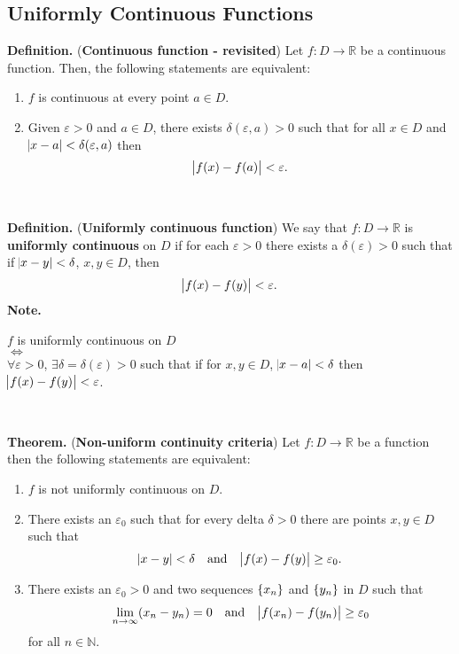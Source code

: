 \documentclass[12pt,a4paper]{article}
\begin{document}
\newpage
\subsection{Uniformly Continuous Functions}

\begin{tcolorbox}[colback=white]
	\textbf{Definition.} (\textbf{Continuous function - revisited}) Let $f:D\to\mathbb{R}$ be a continuous function. Then, the following statements are equivalent:\begin{enumerate}
		\item $f$ is continuous at every point $a\in D$.
		\item Given $\varepsilon>0$ and $a\in D$, there exists $\delta(\varepsilon,a)>0$ such that for all $x\in D$ and $\abs{x-a}<\delta(\varepsilon,a)$ then \[
		\abs{f(x)-f(a)}<\varepsilon.
		\]
	\end{enumerate}
\end{tcolorbox}
\
\begin{tcolorbox}[colback=white]
	\textbf{Definition.} (\textbf{Uniformly continuous function}) We say that $f:D\to\mathbb{R}$ is \textbf{uniformly continuous} on $D$ if for each $\varepsilon>0$ there exists a $\delta(\varepsilon)>0$ such that if $\abs{x-y}<\delta$, $x,y\in D$, then \[
	\abs{f(x)-f(y)}<\varepsilon.
	\]\tcblower
	\textbf{Note.}
	\begin{center}
		$f$ is uniformly continuous on $D$\\
		$\iff$ \\
		$\forall\varepsilon>0$, $\exists\delta=\delta(\varepsilon)>0$ such that if for $x,y\in D$, $\abs{x-a}<\delta$ then $\abs{f(x)-f(y)}<\varepsilon$.
	\end{center}
\end{tcolorbox}
\
\begin{tcolorbox}[colback=white]
	\textbf{Theorem.} (\textbf{Non-uniform continuity criteria}) Let $f:D\to\mathbb{R}$ be a function then the following statements are equivalent:\begin{enumerate}
		\item $f$ is not uniformly continuous on $D$.
		\item  There exists an $\varepsilon_0$ such that for every delta $\delta>0$ there are points $x,y\in D$ such that \[
		\abs{x-y}<\delta\quad\text{and}\quad\abs{f(x)-f(y)}\geq\varepsilon_0.
		\]
		\item There exists an $\varepsilon_0>0$ and two sequences $\set{x_n}$ and $\set{y_n}$ in $D$ such that \[
		\lim\limits_{n\to\infty}(x_n-y_n)=0\quad\text{and}\quad\abs{f(x_n)-f(y_n)}\geq\varepsilon_0
		\] for all $n\in\mathbb{N}$.
	\end{enumerate}
\end{tcolorbox}
\end{document}
